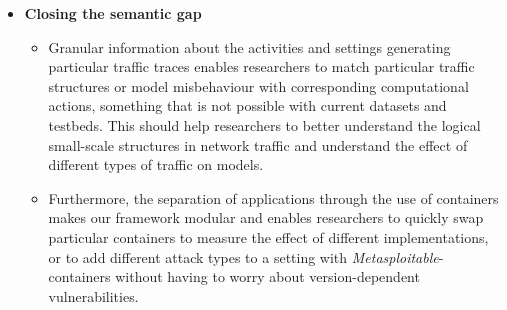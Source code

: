 \documentclass{article}
\begin{document}
\begin{itemize}
\item \textbf{Closing the semantic gap}
\begin{itemize}

\item Granular information about the activities and settings generating particular traffic traces enables researchers to match particular traffic structures or model misbehaviour with corresponding computational actions, something that is not possible with current datasets and testbeds. This should help researchers to
better understand the logical small-scale structures in network traffic and understand the effect of different types of traffic on models. 

\item Furthermore, the separation of applications through the use of containers makes our framework modular and enables researchers to quickly swap particular containers to measure the effect of different implementations, or to add different attack types to a setting with \textit{Metasploitable}-containers without having to worry about version-dependent vulnerabilities.
\end{itemize}
\end{itemize}
\end{document}
